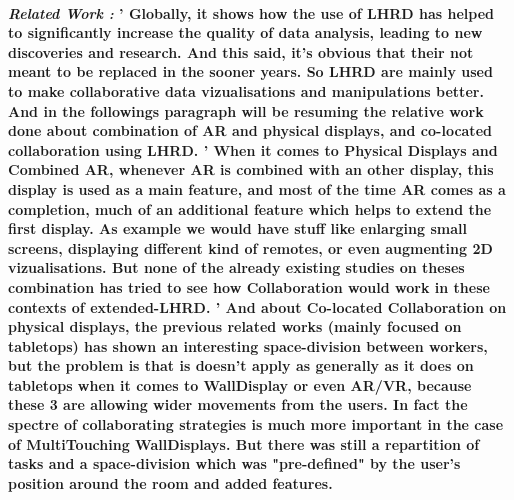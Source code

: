 \documentclass{article}
\begin{document}
    \paragraph{ \textit{Related Work :}
                \newline
                \textnormal{'   Globally, it shows how the use of LHRD has helped to significantly increase the quality of data analysis, leading to 
                new discoveries and research. And this said, it's obvious that their not meant to be replaced in the sooner years. So LHRD are mainly used 
                to make collaborative data vizualisations and manipulations better. And in the followings paragraph will be resuming the relative work done
                about combination of AR and physical displays, and co-located collaboration using LHRD.}
                \newline
                \textnormal{'   When it comes to \textbf{Physical Displays and Combined AR}, whenever AR is combined with an other display, this display is used as a main feature, and most of the time AR comes 
                as a completion, much of an additional feature which helps to extend the first display. As example we would have stuff like enlarging small screens, displaying different kind of remotes, 
                or even augmenting 2D vizualisations. But none of the already existing studies on theses combination has tried to see how Collaboration would work in these contexts of extended-LHRD. }
                \newline
                \textnormal{'   And about Co-located Collaboration on physical displays, the previous related works (mainly focused on tabletops) has shown an interesting space-division between workers, but the
                problem is that is doesn't apply as generally as it does on tabletops when it comes to WallDisplay or even AR/VR, because these 3 are allowing wider movements from the users. In fact the spectre of 
                collaborating strategies is much more important in the case of MultiTouching WallDisplays. But there was still a repartition of tasks and a space-division which was "pre-defined" by the user's position
                around the room and added features.}}
\end{document}
